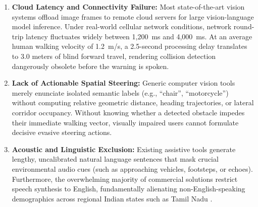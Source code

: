 \documentclass[conference]{IEEEtran}
\begin{document}
\begin{enumerate}
    \item \textbf{Cloud Latency and Connectivity Failure:} Most state-of-the-art vision systems offload image frames to remote cloud servers for large vision-language model inference. Under real-world cellular network conditions, network round-trip latency fluctuates widely between 1,200~ms and 4,000~ms. At an average human walking velocity of 1.2~m/s, a 2.5-second processing delay translates to 3.0 meters of blind forward travel, rendering collision detection dangerously obsolete before the warning is spoken.
    \item \textbf{Lack of Actionable Spatial Steering:} Generic computer vision tools merely enunciate isolated semantic labels (e.g., ``chair'', ``motorcycle'') without computing relative geometric distance, heading trajectories, or lateral corridor occupancy. Without knowing whether a detected obstacle impedes their immediate walking vector, visually impaired users cannot formulate decisive evasive steering actions.
    \item \textbf{Acoustic and Linguistic Exclusion:} Existing assistive tools generate lengthy, uncalibrated natural language sentences that mask crucial environmental audio cues (such as approaching vehicles, footsteps, or echoes). Furthermore, the overwhelming majority of commercial solutions restrict speech synthesis to English, fundamentally alienating non-English-speaking demographics across regional Indian states such as Tamil Nadu \cite{b13}.
\end{enumerate}
\end{document}
